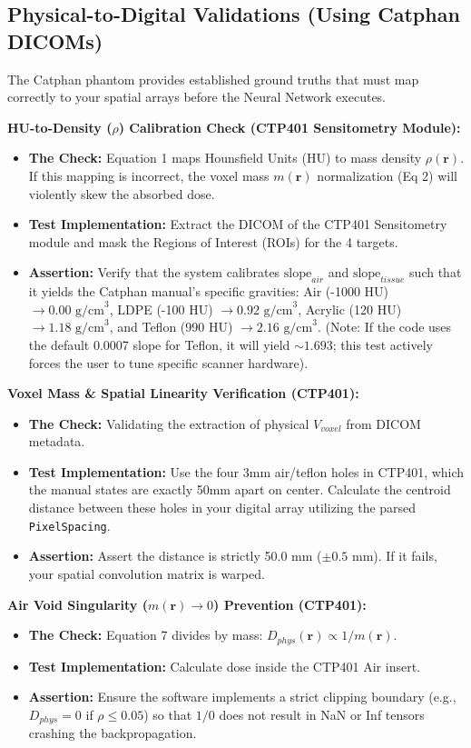 \documentclass[11pt,a4paper]{article}
\begin{document}
\subsection{Physical-to-Digital Validations (Using Catphan DICOMs)}
The Catphan phantom provides established ground truths that must map correctly to your spatial arrays before the Neural Network executes.

\noindent\textbf{HU-to-Density ($\rho$) Calibration Check (CTP401 Sensitometry Module):}
\begin{itemize}
    \item \textbf{The Check:} Equation 1 maps Hounsfield Units (HU) to mass density $\rho(\mathbf{r})$. If this mapping is incorrect, the voxel mass $m(\mathbf{r})$ normalization (Eq 2) will violently skew the absorbed dose.
    \item \textbf{Test Implementation:} Extract the DICOM of the CTP401 Sensitometry module and mask the Regions of Interest (ROIs) for the 4 targets.
    \item \textbf{Assertion:} Verify that the system calibrates $\text{slope}_{air}$ and $\text{slope}_{tissue}$ such that it yields the Catphan manual's specific gravities: Air (-1000 HU) $\rightarrow 0.00 \text{ g/cm}^3$, LDPE (-100 HU) $\rightarrow 0.92 \text{ g/cm}^3$, Acrylic (120 HU) $\rightarrow 1.18 \text{ g/cm}^3$, and Teflon (990 HU) $\rightarrow 2.16 \text{ g/cm}^3$. (Note: If the code uses the default 0.0007 slope for Teflon, it will yield $\sim 1.693$; this test actively forces the user to tune specific scanner hardware).
\end{itemize}

\noindent\textbf{Voxel Mass \& Spatial Linearity Verification (CTP401):}
\begin{itemize}
    \item \textbf{The Check:} Validating the extraction of physical $V_{voxel}$ from DICOM metadata.
    \item \textbf{Test Implementation:} Use the four 3mm air/teflon holes in CTP401, which the manual states are exactly 50mm apart on center. Calculate the centroid distance between these holes in your digital array utilizing the parsed \texttt{PixelSpacing}.
    \item \textbf{Assertion:} Assert the distance is strictly 50.0 mm ($\pm 0.5$ mm). If it fails, your spatial convolution matrix is warped.
\end{itemize}

\noindent\textbf{Air Void Singularity ($m(\mathbf{r}) \rightarrow 0$) Prevention (CTP401):}
\begin{itemize}
    \item \textbf{The Check:} Equation 7 divides by mass: $D_{phys}(\mathbf{r}) \propto 1/m(\mathbf{r})$.
    \item \textbf{Test Implementation:} Calculate dose inside the CTP401 Air insert.
    \item \textbf{Assertion:} Ensure the software implements a strict clipping boundary (e.g., $D_{phys} = 0$ if $\rho \le 0.05$) so that $1/0$ does not result in NaN or Inf tensors crashing the backpropagation.
\end{itemize}
\end{document}
